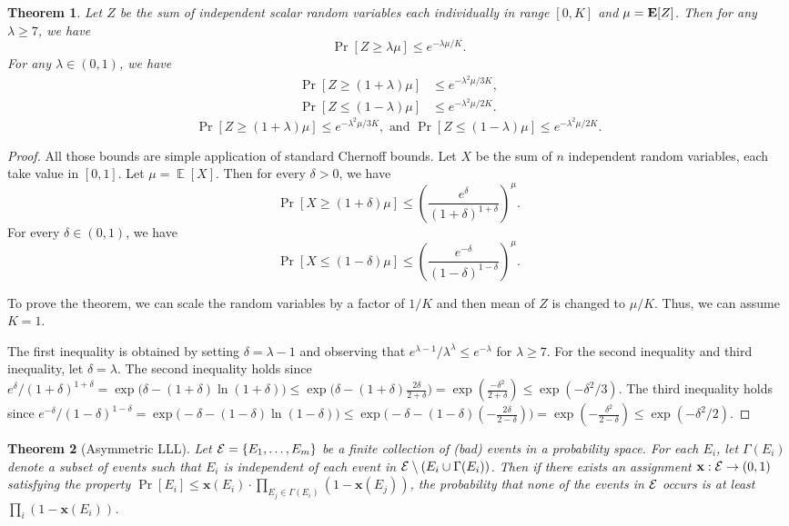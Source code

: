 \documentclass[11pt]{article}
\newtheorem{theorem}{Theorem} \newtheorem{lemma}{Lemma}[section]
\newcounter{prop}
\DeclareMathOperator{\E}{\mathbb E}
\newcommand{\x}{{\mathbf x}}
\newcommand{\Exp}{\EX}
\newcommand{\EX}{\hbox{\bf E}}
\begin{document}
\begin{theorem}
\label{thm:Chernoff}
Let $Z$ be the sum of independent scalar random variables each individually in range $[0,K]$ and $\mu = \Exp[Z]$. Then for any $\lambda \geq 7$, we have
\[ \Pr[Z \geq \lambda \mu] \leq  e^{-\lambda\mu/K}. \]
For any $\lambda  \in (0, 1)$, we have
\ifdefined\CR
\begin{align*}
\Pr[Z \geq (1+\lambda) \mu] &\leq  e^{-\lambda^2\mu/3K}, \\
\Pr[Z \leq (1-\lambda) \mu] &\leq  e^{-\lambda^2\mu/2K}.
\end{align*}
\else
\[\Pr[Z \geq (1+\lambda) \mu] \leq  e^{-\lambda^2\mu/3K}, \text{ and } \Pr[Z \leq (1-\lambda) \mu] \leq  e^{-\lambda^2\mu/2K}.\]
\fi
\end{theorem}
\begin{proof}
All those bounds are simple application of standard Chernoff bounds.  Let $X$ be the sum of $n$ independent random variables, each take value in $[0, 1]$.  Let $\mu = \E[X]$. Then for every $\delta > 0$, we have 
\begin{equation*}
\Pr[X \geq (1 + \delta)\mu] \leq \left(\frac{e^{\delta}}{(1+\delta)^{1+\delta}}\right)^\mu.
\end{equation*}
For every $\delta \in (0, 1)$, we have 
\begin{equation*}
\Pr[X \leq (1-\delta)\mu] \leq \left(\frac{e^{-\delta}}{(1-\delta)^{1-\delta}}\right)^\mu.
\end{equation*}

To prove the theorem, we can scale the random variables by a factor of $1/K$ and then mean of $Z$ is changed to $\mu/K$. Thus, we can assume $K=1$.  

The first inequality is obtained by setting $\delta = \lambda - 1$ and observing that $e^{\lambda - 1}/\lambda^\lambda \leq e^{-\lambda}$ for $\lambda \geq 7$.  For the second inequality and third inequality, let $\delta = \lambda$. The second inequality holds since $e^{\delta}/(1+\delta)^{1+\delta} = \exp\big(\delta - (1+\delta)\ln(1+\delta)\big) \leq \exp\big(\delta - (1+\delta)\frac{2\delta}{2+\delta}\big) = \exp\left(\frac{-\delta^2}{2+\delta}\right) \leq \exp(-\delta^2/3)$. The third inequality holds since $e^{-\delta}/(1-\delta)^{1-\delta} = \exp\big(-\delta - (1-\delta)\ln(1-\delta)\big) \leq \exp\big(-\delta - (1-\delta)(-\frac{2\delta}{2-\delta })\big) = \exp\left(-\frac{\delta^2}{2-\delta}\right) \leq \exp(-\delta^2/2)$.

\end{proof}
\begin{theorem}[Asymmetric LLL]\label{thm:lll}
Let ${\cal E} = \{ E_1,\ldots, E_m \}$ be a finite collection of (bad) events in a probability space.
For each $E_i$, let $\Gamma(E_i)$ denote a subset of events such that $E_i$ is independent of each event in ${\cal E}\setminus (E_i \cup \Gamma(E_i))$. Then if there exists an assignment 
$\x: {\cal E} \rightarrow (0,1)$ satisfying the property $\Pr[E_i]\leq \x(E_i)\cdot \prod_{E_j \in \Gamma(E_i)} \left(1-\x(E_j)\right)$,
the probability that none of the events in ${\cal E}$ occurs is at least $\prod_i \left(1 - \x(E_i)\right)$.
\end{theorem}
\end{document}
